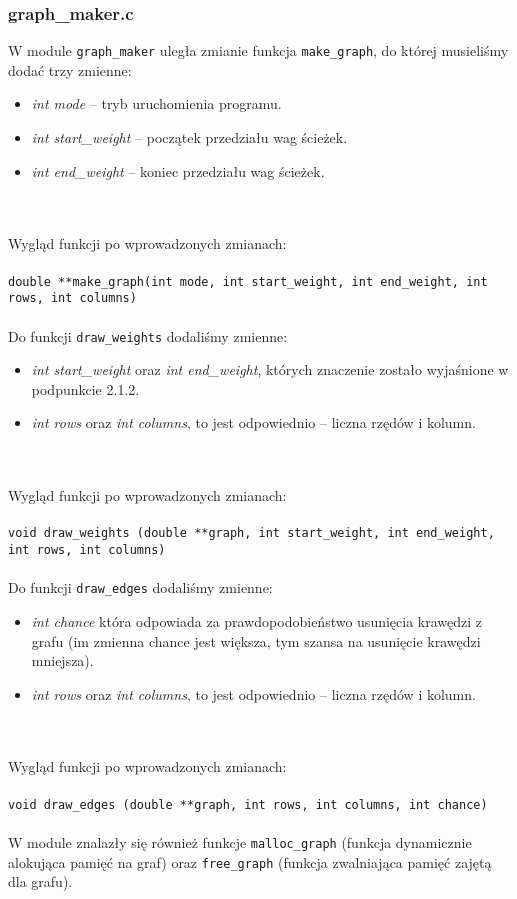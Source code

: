 \documentclass[12pt, a4paper]{article}
\begin{document}
\subsubsection{graph\_maker.c}
W module \texttt{graph\_maker} uległa zmianie funkcja \texttt{make\_graph}, do której musieliśmy dodać trzy zmienne: 
\begin{itemize}
    \item \textit{int mode} -- tryb uruchomienia programu.
    \item \textit{int start\_weight} -- początek przedziału wag ścieżek.
    \item \textit{int end\_weight} -- koniec przedziału wag ścieżek.
\end{itemize}
\\\\
Wygląd funkcji po wprowadzonych zmianach:\\\\
\texttt{double **make\_graph(int mode, int start\_weight, int end\_weight, int rows, int columns)}
\\\\

Do funkcji \texttt{draw\_weights} dodaliśmy zmienne:
\begin{itemize}
    \item \textit{int start\_weight} oraz \textit{int end\_weight}, których znaczenie zostało wyjaśnione w podpunkcie 2.1.2.
    \item \textit{int rows} oraz \textit{int columns}, to jest odpowiednio -- liczna rzędów i kolumn. 
\end{itemize}
\\\\
\newpage
Wygląd funkcji po wprowadzonych zmianach:\\\\
\texttt{void draw\_weights (double **graph, int start\_weight, int end\_weight, int rows, int columns)}
\\\\


Do funkcji \texttt{draw\_edges} dodaliśmy zmienne:
\begin{itemize}
    \item \textit{int chance} która odpowiada za prawdopodobieństwo usunięcia krawędzi z grafu (im zmienna chance jest większa, tym szansa na usunięcie krawędzi mniejsza).
    \item \textit{int rows} oraz \textit{int columns}, to jest odpowiednio -- liczna rzędów i kolumn. 
\end{itemize}
\\\\
Wygląd funkcji po wprowadzonych zmianach:\\\\
\texttt{void draw\_edges (double **graph, int rows, int columns, int chance)}
\\
\\
W module znalazły się również funkcje \texttt{malloc\_graph} (funkcja dynamicznie alokująca pamięć na graf) oraz \texttt{free\_graph} (funkcja zwalniająca pamięć zajętą dla grafu).
\end{document}
